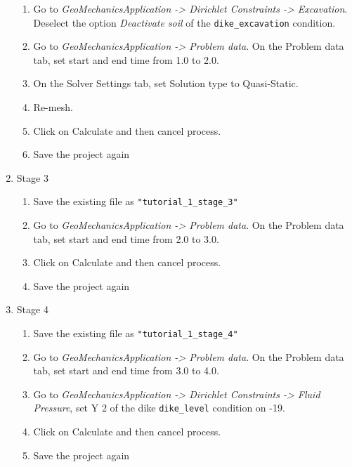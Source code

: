 \begin{enumerate}[resume]
\begin{enumerate}
		\item Go to \textit{GeoMechanicsApplication -> Dirichlet Constraints -> Excavation}. Deselect the option \textit{Deactivate soil} of the \verb|dike_excavation| condition.
		
		\item Go to \textit{GeoMechanicsApplication -> Problem data}. On the Problem data tab, set start and end time from 1.0 to 2.0.
		
		\item On the Solver Settings tab, set Solution type to Quasi-Static.
		
		\item Re-mesh. 
		
		\item Click on Calculate and then cancel process.
		\item Save the project again
	\end{enumerate}

	\item Stage 3
	\begin{enumerate}
		\item Save the existing file as \verb|"tutorial_1_stage_3"|
		
		\item Go to \textit{GeoMechanicsApplication -> Problem data}. On the Problem data tab, set start and end time from 2.0 to 3.0.
		
		\item Click on Calculate and then cancel process.
		
		\item Save the project again
	\end{enumerate}
	
	\item Stage 4
	\begin{enumerate}
		\item Save the existing file as \verb|"tutorial_1_stage_4"|
		
		\item Go to \textit{GeoMechanicsApplication -> Problem data}. On the Problem data tab, set start and end time from 3.0 to 4.0.
		
		\item  Go to \textit{GeoMechanicsApplication -> Dirichlet Constraints -> Fluid Pressure}, set Y 2 of the dike \verb|dike_level| condition on -19. 
		
		\item Click on Calculate and then cancel process.
		
		\item Save the project again
	\end{enumerate}
		
\end{enumerate}

